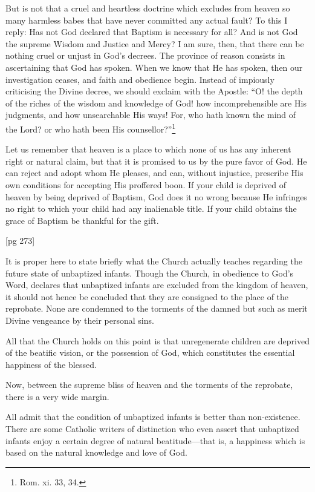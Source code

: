 But is not that a cruel and heartless doctrine
which excludes from heaven so many harmless
babes that have never committed any actual fault?
To this I reply: Has not God declared that Baptism
is necessary for all? And is not God the
supreme Wisdom and Justice and Mercy? I am
sure, then, that there can be nothing cruel or unjust
in God's decrees. The province of reason
consists in ascertaining that God has spoken.
When we know that He has spoken, then our investigation
ceases, and faith and obedience begin.
Instead of impiously criticising the Divine
decree, we should exclaim with the Apostle: “O!
the depth of the riches of the wisdom and knowledge
of God! how incomprehensible are His judgments,
and how unsearchable His ways! For, who
hath known the mind of the Lord? or who hath
been His counsellor?”\footnote{Rom. xi. 33, 34.}

Let us remember that heaven is a place to which
none of us has any inherent right or natural claim,
but that it is promised to us by the pure favor
of God. He can reject and adopt whom He
pleases, and can, without injustice, prescribe His
own conditions for accepting His proffered boon.
If your child is deprived of heaven by being deprived
of Baptism, God does it no wrong because
He infringes no right to which your child had
any inalienable title. If your child obtains the
grace of Baptism be thankful for the gift.

[pg 273]

It is proper here to state briefly what the
Church actually teaches regarding the future state
of unbaptized infants. Though the Church, in
obedience to God's Word, declares that unbaptized
infants are excluded from the kingdom of
heaven, it should not hence be concluded that they
are consigned to the place of the reprobate. None
are condemned to the torments of the damned
but such as merit Divine vengeance by their personal
sins.

All that the Church holds on this point is that
unregenerate children are deprived of the beatific
vision, or the possession of God, which constitutes
the essential happiness of the blessed.

Now, between the supreme bliss of heaven and
the torments of the reprobate, there is a very
wide margin.

All admit that the condition of unbaptized infants
is better than non-existence. There are
some Catholic writers of distinction who even assert
that unbaptized infants enjoy a certain degree
of natural beatitude—that is, a happiness
which is based on the natural knowledge and love
of God.

